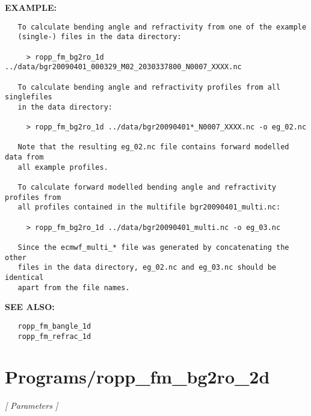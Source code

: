 \textbf{EXAMPLE:}\hspace{0.08in}\begin{Verbatim}
   To calculate bending angle and refractivity from one of the example
   (single-) files in the data directory:

     > ropp_fm_bg2ro_1d ../data/bgr20090401_000329_M02_2030337800_N0007_XXXX.nc

   To calculate bending angle and refractivity profiles from all singlefiles
   in the data directory:

     > ropp_fm_bg2ro_1d ../data/bgr20090401*_N0007_XXXX.nc -o eg_02.nc

   Note that the resulting eg_02.nc file contains forward modelled data from
   all example profiles.

   To calculate forward modelled bending angle and refractivity profiles from
   all profiles contained in the multifile bgr20090401_multi.nc:

     > ropp_fm_bg2ro_1d ../data/bgr20090401_multi.nc -o eg_03.nc

   Since the ecmwf_multi_* file was generated by concatenating the other
   files in the data directory, eg_02.nc and eg_03.nc should be identical
   apart from the file names.
\end{Verbatim}
\textbf{SEE ALSO:}\hspace{0.08in}\begin{Verbatim}
   ropp_fm_bangle_1d
   ropp_fm_refrac_1d
\end{Verbatim}
\section{Programs/ropp\_fm\_bg2ro\_2d}
\textsl{[ Parameters ]}

